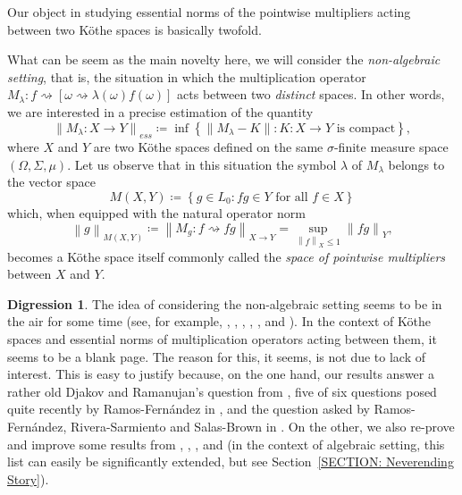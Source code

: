 \documentclass[11pt]{amsart}
\theoremstyle{definition}
\theoremstyle{definition}
\theoremstyle{definition}
\theoremstyle{definition}
\theoremstyle{definition}
\theoremstyle{definition}
\theoremstyle{definition}
\theoremstyle{definition}
\numberwithin{equation}{section}
\numberwithin{equation}{section}
\numberwithin{equation}{section}
\theoremstyle{definition}
\theoremstyle{definition}
\theoremstyle{definition}
\theoremstyle{definition}
\newtheorem{scholium}[theorem]{Digression}
\theoremstyle{definition}
\theoremstyle{definition}
\newcommand{\norm}[1]{\left\lVert#1\right\rVert}
\begin{document}
Our object in studying essential norms of the pointwise multipliers acting between two K{\" o}the spaces is basically twofold.

What can be seem as the main novelty here, we will consider the {\it non-algebraic setting}, that is, the situation in which the multiplication
operator $M_{\lambda} \colon f \rightsquigarrow \left[ \omega \rightsquigarrow \lambda(\omega) f(\omega) \right]$ acts between two {\it distinct} spaces.
In other words, we are interested in a precise estimation of the quantity
\begin{equation*}
	\norm{M_{\lambda} \colon X \rightarrow Y}_{ess} \coloneqq \inf \left\{ \norm{M_{\lambda} - K} \colon K \colon X \rightarrow Y \text{ is compact} \right\},
\end{equation*}
where $X$ and $Y$ are two K{\" o}the spaces defined on the same $\sigma$-finite measure space $(\Omega,\Sigma,\mu)$.
Let us observe that in this situation the symbol $\lambda$ of $M_{\lambda}$ belongs to the vector space
\begin{equation*}
	M(X,Y) \coloneqq \left\{ g \in L_0 \colon fg \in Y \text{ for all } f \in X \right\}
\end{equation*}
which, when equipped with the natural operator norm
\begin{equation*}
	\norm{g}_{M(X,Y)} \coloneqq \norm{M_g \colon f \rightsquigarrow fg}_{X \rightarrow Y} = \sup_{\norm{f}_X \leqslant 1} \norm{fg}_Y,
\end{equation*}
becomes a K{\" o}the space itself commonly called the {\it space of pointwise multipliers} between $X$ and $Y$.

\begin{scholium}
	The idea of considering the non-algebraic setting seems to be in the air for some time (see, for example, \cite{ABR18}, \cite{Bay23}, \cite{CHD03},
	\cite{CZ07}, \cite{Dem11}, \cite{ES05} and \cite{LM21}).
	In the context of K{\" o}the spaces and essential norms of multiplication operators acting between them, it seems to be a blank page.
	The reason for this, it seems, is not due to lack of interest.
	This is easy to justify because, on the one hand, our results answer a rather old Djakov and Ramanujan's question from \cite{DR00},
	five of six questions posed quite recently by Ramos-Fern{\' a}ndez in \cite{RF16},
	and the question asked by Ramos-Fern{\' a}ndez, Rivera-Sarmiento and Salas-Brown in \cite{RFRSSB19}.
	On the other, we also re-prove and improve some results from \cite{AGHLM18}, \cite{ABR18}, \cite{Ben96}, \cite{BR20} and \cite{Mle09}
	(in the context of algebraic setting, this list can easily be significantly extended, but see Section~\ref{SECTION: Neverending Story}).
\end{scholium}
\end{document}
